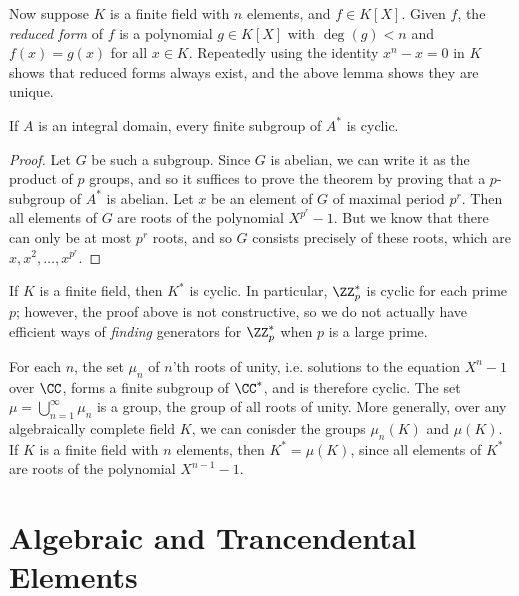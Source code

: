 Now suppose $K$ is a finite field with $n$ elements, and $f \in K[X]$. Given $f$, the \emph{reduced form} of $f$ is a polynomial $g \in K[X]$ with $\deg(g) < n$ and $f(x) = g(x)$ for all $x \in K$. Repeatedly using the identity $x^n - x = 0$ in $K$ shows that reduced forms always exist, and the above lemma shows they are unique.

\begin{theorem}
    If $A$ is an integral domain, every finite subgroup of $A^*$ is cyclic.
\end{theorem}
\begin{proof}
    Let $G$ be such a subgroup. Since $G$ is abelian, we can write it as the product of $p$ groups, and so it suffices to prove the theorem by proving that a $p$-subgroup of $A^*$ is abelian. Let $x$ be an element of $G$ of maximal period $p^r$. Then all elements of $G$ are roots of the polynomial $X^{p^r} - 1$. But we know that there can only be at most $p^r$ roots, and so $G$ consists precisely of these roots, which are $x, x^2, \dots, x^{p^r}$.
\end{proof}

\begin{example}
    If $K$ is a finite field, then $K^*$ is cyclic. In particular, $\ZZ_p^*$ is cyclic for each prime $p$; however, the proof above is not constructive, so we do not actually have efficient ways of \emph{finding} generators for $\ZZ_p^*$ when $p$ is a large prime.
 \end{example}

 \begin{example}
    For each $n$, the set $\mu_n$ of $n$'th roots of unity, i.e. solutions to the equation $X^n - 1$ over $\CC$, forms a finite subgroup of $\CC^*$, and is therefore cyclic. The set $\mu = \bigcup_{n = 1}^\infty \mu_n$ is a group, the group of all roots of unity. More generally, over any algebraically complete field $K$, we can conisder the groups $\mu_n(K)$ and $\mu(K)$. If $K$ is a finite field with $n$ elements, then $K^* = \mu(K)$, since all elements of $K^*$ are roots of the polynomial $X^{n-1} - 1$.
\end{example}

\section{Algebraic and Trancendental Elements}

